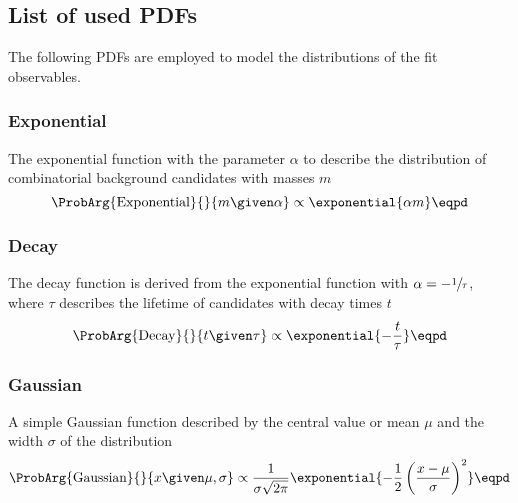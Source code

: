 \subsection{List of used \aclp{PDF}}
\label{sec:measurement_of_sin2beta:likelihood_fit:pdfs}

The following \acp{PDF} are employed to model the distributions of the fit
observables.

\subsubsection{Exponential}
\label{sec:measurement_of_sin2beta:likelihood_fit:pdfs:exponential}

The exponential function with the parameter $\alpha$ to describe \eg the
distribution of combinatorial background candidates with masses $m$
%
\begin{equation}\label{eq:measurement_of_sin2beta:likelihood_fit:pdfs:exponential}
  \ProbArg{\text{Exponential}}{}{m \given \alpha} \propto \exponential{\alpha m}\eqpd
\end{equation}

\subsubsection{Decay}
\label{sec:measurement_of_sin2beta:likelihood_fit:pdfs:decay}

The decay function is derived from the exponential function with $\alpha =
-\sfrac{1}{\tau}$, where $\tau$ describes the lifetime of candidates with decay
times $t$
%
\begin{equation}\label{eq:measurement_of_sin2beta:likelihood_fit:pdfs:decay}
  \ProbArg{\text{Decay}}{}{t \given \tau} \propto \exponential{- \frac{t}{\tau}}\eqpd
\end{equation}

\subsubsection{Gaussian}
\label{sec:measurement_of_sin2beta:likelihood_fit:pdfs:gaussian}

A simple Gaussian function described by the central value or mean $\mu$ and the
width $\sigma$ of the distribution
%
\begin{equation}\label{eq:measurement_of_sin2beta:likelihood_fit:pdfs:gaussian}
  \ProbArg{\text{Gaussian}}{}{x \given \mu, \sigma} \propto \frac{1}{\sigma\sqrt{2\pi}}\exponential{-\frac{1}{2} \left(\frac{x-\mu}{\sigma}\right)^2}\eqpd
\end{equation}


